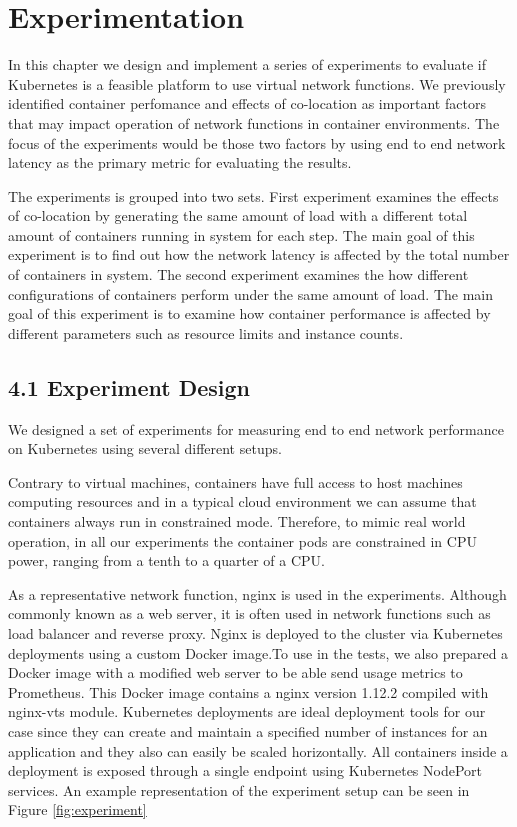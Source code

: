 \documentclass[12pt,oneandhalf,chaparabic,ceng,ms,eng,oneside,pntc]{gsufbe}
\begin{document}
\chapter{Experimentation}
In this chapter we design and implement a series of experiments to evaluate if Kubernetes is
a feasible platform to use virtual network functions. We previously identified container perfomance and
effects of co-location as important factors that may impact operation of network functions in container
environments. The focus of the experiments would be those two factors by using end to end network latency
as the primary metric for evaluating the results.

The experiments is grouped into two sets. First experiment examines the effects of co-location by generating
the same amount of load with a different total amount of containers running in system for each step. The main
goal of this experiment is to find out how the network latency is affected by the total number of containers
in system.\linebreak
The second experiment examines the how different configurations of containers perform under the same amount of
load. The main goal of this experiment is to examine how container performance is affected by different parameters
such as resource limits and instance counts.

\section[Experiment Design]{4.1 Experiment Design}
We designed a set of experiments for measuring end to end network performance on Kubernetes using several
different setups.

Contrary to virtual machines, containers have full
access to host machines computing resources and in a typical cloud environment we can assume that
containers always run in constrained mode.  Therefore, to mimic real world operation, in all our
experiments  the container pods are constrained in CPU power, ranging from a tenth to a quarter of a CPU.

As a representative  network function, nginx is used in the experiments. Although commonly known as a
web server, it is often used in network
functions such as load balancer and reverse proxy.  Nginx is deployed to the cluster via Kubernetes
deployments using a custom Docker image.To use in the tests, we also  prepared a Docker image with a
modified web server to be able send usage metrics to Prometheus.  This Docker image contains a nginx
version 1.12.2 compiled with nginx-vts module. Kubernetes deployments are ideal deployment tools for
our case since they can create and maintain a specified number of instances for an application and
they also can easily be scaled horizontally.  All containers inside a deployment is exposed 
through a single endpoint using Kubernetes NodePort services. An example representation of the experiment
setup can be seen in Figure \ref{fig:experiment}
\end{document}
